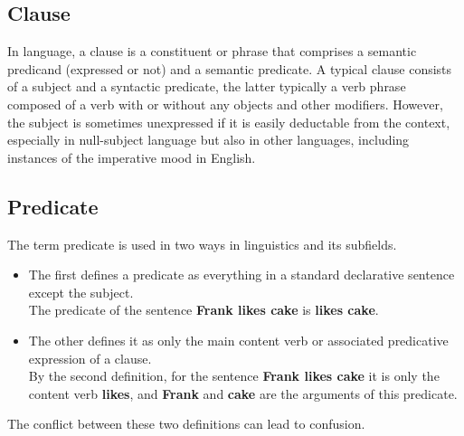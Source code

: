 \subsection{Clause \cite{wiki-clause}}\label{Language: Clause}
In language, a clause is a constituent or phrase that comprises a semantic predicand (expressed or not) and a semantic predicate. A typical clause consists of a subject and a syntactic predicate, the latter typically a verb phrase composed of a verb with or without any objects and other modifiers. However, the subject is sometimes unexpressed if it is easily deductable from the context, especially in null-subject language but also in other languages, including instances of the imperative mood in English.

\subsection{Predicate \cite{wiki-Predicate}}\label{Language: Predicate}
The term predicate is used in two ways in linguistics and its subfields. 
\begin{itemize}
    \item The first defines a predicate as everything in a standard declarative sentence except the subject.\\
    The predicate of the sentence \textbf{Frank likes cake} is \textbf{likes cake}.

    \item The other defines it as only the main content verb or associated predicative expression of a clause.\\
    By the second definition, for the sentence \textbf{Frank likes cake} it is only the content verb \textbf{likes}, and \textbf{Frank} and \textbf{cake} are the arguments of this predicate.    
\end{itemize}

The conflict between these two definitions can lead to confusion.


